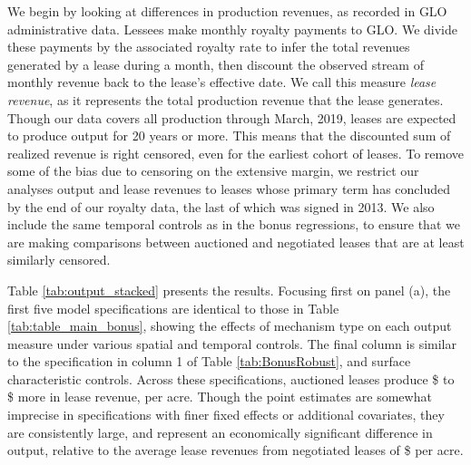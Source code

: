 We begin by looking at differences in production revenues, as recorded in GLO administrative data. Lessees make monthly royalty payments to GLO. We divide these payments by the associated royalty rate to infer the total revenues generated by a lease during a month, then discount the observed stream of monthly revenue back to the lease's effective date.  We call this measure \textit{lease revenue}, as it represents the total production revenue that the lease generates.  Though our data covers all production through March, 2019, leases are expected to produce output for 20 years or more. This means that the discounted sum of realized revenue is right censored, even for the earliest cohort of leases. To remove some of the bias due to censoring on the extensive margin, we restrict our analyses output and lease revenues to leases whose primary term has concluded by the end of our royalty data, the last of which was signed in 2013. We also include the same temporal controls as in the bonus regressions, to ensure that we are making comparisons between auctioned and negotiated leases that are at least similarly censored.  

Table \ref{tab:output_stacked} presents the results. Focusing first on panel (a), the first five model specifications are identical to those in Table \ref{tab:table_main_bonus}, showing the effects of mechanism type on each output measure under various spatial and temporal controls.  The final column is similar to the specification in column 1 of Table \ref{tab:BonusRobust}, and surface characteristic controls.  Across these specifications, auctioned leases produce \$ to \$ more in lease revenue, per acre. Though the point estimates are somewhat imprecise in specifications with finer fixed effects or additional covariates, they are consistently large, and represent an economically significant difference in output, relative to the average lease revenues from negotiated leases of \$ per acre. 

